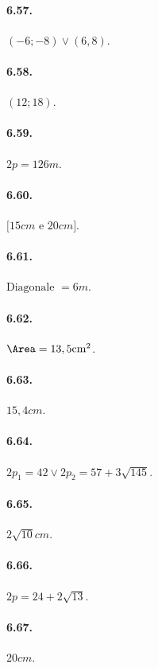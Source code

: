 \begin{multicols}{2}
\paragraph{6.57.} $(-6;-8)\vee (6,8)$.

\paragraph{6.58.} $(12;18)$.

\paragraph{6.59.} $2p=126\unit{m}$.

\paragraph{6.60.} $[15\unit{cm}$ e $20\unit{cm}]$.

\paragraph{6.61.} $\text{Diagonale }=6\unit{m}$.

\paragraph{6.62.} $\Area=13,5\unit{{cm}^2}$.

\paragraph{6.63.} $15,4\unit{cm}$.

\paragraph{6.64.} $2p_1=42\vee 2p_2=57+3\sqrt{145}$.

\paragraph{6.65.} $2\sqrt{10}\unit{cm}$.

\paragraph{6.66.} $2p=24+2\sqrt{13}$.

\paragraph{6.67.} $20\unit{cm}$.


\end{multicols}
